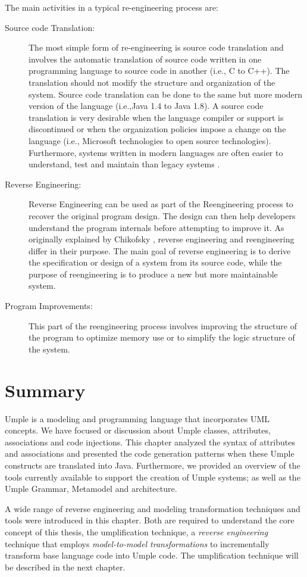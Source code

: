 The main activities in a typical re-engineering process are:

\begin{description}
\item[Source code Translation:]
The most simple form of re-engineering is source code translation and involves the automatic translation of source code written in one programming language to source code in another (i.e., C to C++). The translation should not modify the structure and organization of the system. Source code translation can be done to the same but more modern version of the language (i.e.,Java 1.4 to Java 1.8). A source code translation is very desirable when the language compiler or support is discontinued or when the organization policies impose a change on the language (i.e., Microsoft technologies to open source technologies). Furthermore, systems written in modern languages are often easier to understand, test and maintain than legacy systems \cite{Pressman2001}.

\item[Reverse Engineering:]
Reverse Engineering can be used as part of the Reengineering process to recover the original program design. The design can then help developers understand the program internals before attempting to improve it. As originally explained by Chikofsky  \cite{Chikofsky}, reverse engineering and reengineering differ in their purpose. The main goal of reverse engineering is to derive the specification or design of a system from its source code, while the purpose of reengineering is to produce a new but more maintainable system. 

\item[Program Improvements:]
This part of the reengineering process involves improving the structure of the program to optimize memory use or to simplify the logic structure of the system. 
\end{description}

\section{Summary}

Umple is a modeling and programming language that incorporates UML concepts. We have focused or discussion about Umple classes, attributes, associations and code injections. This chapter analyzed the syntax of attributes and associations and presented the code generation patterns when these Umple constructs are translated into Java. Furthermore, we provided an overview of the tools currently available to support the creation of Umple systems; as well as the Umple Grammar, Metamodel and architecture.

A wide range of reverse engineering and modeling transformation techniques and tools were introduced in this chapter. Both are required to understand the core concept of this thesis, the umplification technique, a \textit{reverse engineering} technique that employs \textit{model-to-model transformations} to  incrementally transform base language code into Umple code. The umplification technique will be described in the next chapter.